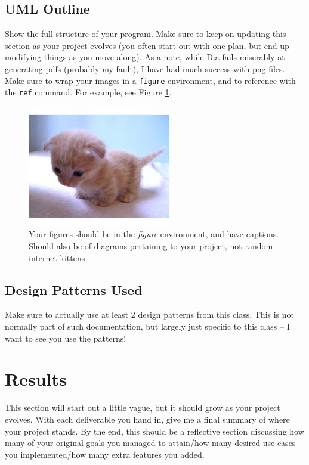 \documentclass[10pt,conference,onecolumn,compsoc]{IEEEtran}
\begin{document}
\subsection{UML Outline}
Show the full structure of your program.  Make sure to keep on updating this section as your project evolves (you often start out with one plan, but end up modifying things as you move along).  As a note, while Dia fails miserably at generating pdfs (probably my fault), I have had much success with png files.  Make sure to wrap your images in a \texttt{figure} environment, and to reference with the \texttt{ref} command.  For example, see Figure \ref{cat2}.

\begin{figure}[ht!]
\includegraphics[scale=1.5]{cat2.jpg}
\caption{Your figures should be in the \emph{figure} environment, and have captions.  Should also be of diagrams pertaining to your project, not random internet kittens}
\label{cat2}
\end{figure}

\subsection{Design Patterns Used}
Make sure to actually use at least 2 design patterns from this class.  This is not normally part of such documentation, but largely just specific to this class -- I want to see you use the patterns!


\section{Results}
This section will start out a little vague, but it should grow as your project evolves.  With each deliverable you hand in, give me a final summary of where your project stands.  By the end, this should be a reflective section discussing how many of your original goals you managed to attain/how many desired use cases you implemented/how many extra features you added.
\end{document}
